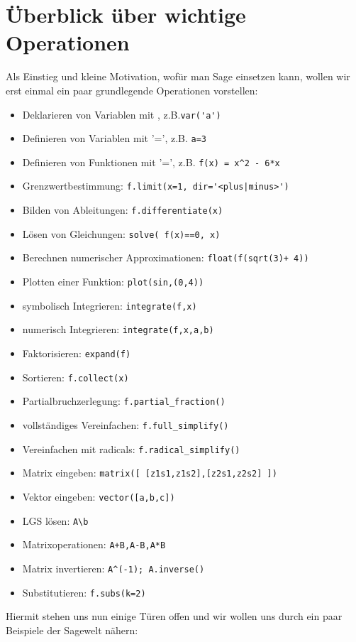 \documentclass[fontsize=12pt,paper=a4,twoside,bibtotoc,idxtotoc,
liststotoc,pagesize,BCOR1.2cm,DIV15,chapterprefix,pagesize=pdftex]{scrbook}
\theoremstyle{plain}
\theoremstyle{definition}
\theoremstyle{remark}
\begin{document}
\section{Überblick über wichtige Operationen}

Als Einstieg und kleine Motivation, wofür man Sage einsetzen kann, wollen wir erst einmal ein paar grundlegende Operationen 
vorstellen:
\begin{itemize}
 \item Deklarieren von Variablen mit , z.B.{\verb~var('a')~} 
 \item Definieren von Variablen mit {\color{blue}'='}, z.B. {\verb~a=3~} 
 \item Definieren von Funktionen mit{\color{blue} '='}, z.B. {\verb~f(x) = x^2 - 6*x~}
 \item Grenzwertbestimmung: {\color{blue}   \verb~f.limit(x=1, dir='<plus|minus>')~}
 \item Bilden von Ableitungen: {\color{blue} \verb~f.differentiate(x)~}
 \item Lösen von Gleichungen: {\color{blue} \verb~solve( f(x)==0, x)~}
 \item Berechnen numerischer Approximationen: {\color{blue} \verb~float(f(sqrt(3)+ 4))~}
 \item Plotten einer Funktion: {\color{blue} \verb~plot(sin,(0,4))~}
 \item symbolisch Integrieren: {\color{blue} \verb~integrate(f,x)~}
 \item numerisch Integrieren: {\color{blue} \verb~integrate(f,x,a,b)~}
 \item Faktorisieren: {\color{blue} \verb~expand(f)~}
 \item Sortieren: {\color{blue} \verb~f.collect(x)~}
 \item Partialbruchzerlegung: {\color{blue} \verb~f.partial_fraction()~}
 \item vollständiges Vereinfachen: {\color{blue} \verb~f.full_simplify()~}
 \item Vereinfachen mit radicals: {\color{blue} \verb~f.radical_simplify()~}
 \item Matrix eingeben: {\color{blue} \verb~matrix([ [z1s1,z1s2],[z2s1,z2s2] ])~}
 \item Vektor eingeben: {\color{blue} \verb~vector([a,b,c])~}
 \item LGS lösen: {\color{blue} \verb~A\b~}
 \item Matrixoperationen: {\color{blue} \verb~A+B,A-B,A*B~}
 \item Matrix invertieren: {\color{blue} \verb~A^(-1); A.inverse()~}
 \item Substitutieren: {\color{blue} \verb~f.subs(k=2)~}
\end{itemize}
Hiermit stehen uns nun einige Türen offen und wir wollen uns durch ein paar Beispiele der Sagewelt nähern:
\end{document}
